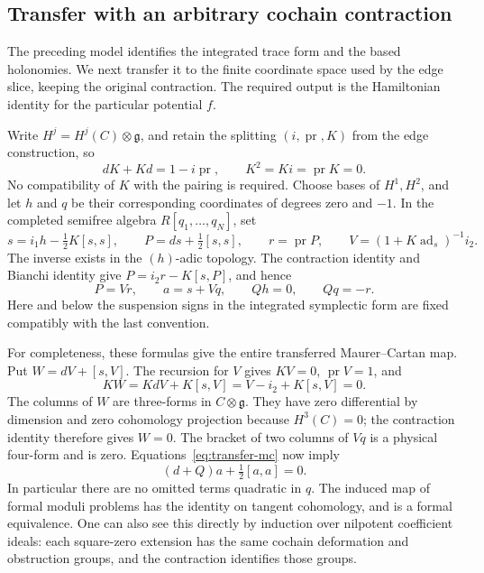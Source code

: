 \subsection{Transfer with an arbitrary cochain contraction}

The preceding model identifies the integrated trace form and the based
holonomies. We next transfer it to the finite coordinate space used by
the edge slice, keeping the original contraction. The required output
is the Hamiltonian identity for the particular potential $f$.

Write \(H^j=H^j(C)\otimes\mathfrak g\), and retain the splitting
\((i,\operatorname{pr},K)\) from the edge construction, so
\[
 dK+Kd=1-i\operatorname{pr},\qquad
 K^2=Ki=\operatorname{pr}K=0.
\]
No compatibility of \(K\) with the pairing is required.  Choose bases
of \(H^1,H^2\), and let \(h\) and \(q\) be their corresponding
coordinates of degrees zero and \(-1\).  In the completed semifree
algebra \(R[q_1,\ldots,q_N]\), set
\begin{equation}
\label{eq:transfer-v}
 s=i_1h-\tfrac12K[s,s],\qquad
 P=ds+\tfrac12[s,s],\qquad r=\operatorname{pr}P,
 \qquad V=(1+K\operatorname{ad}_s)^{-1}i_2.
\end{equation}
The inverse exists in the \((h)\)-adic topology.  The contraction
identity and Bianchi identity give
\(P=i_2r-K[s,P]\), and hence
\begin{equation}
\label{eq:transfer-mc}
                 P=Vr,\qquad a=s+Vq,\qquad Qh=0,
                 \qquad Qq=-r.
\end{equation}
Here and below the suspension signs in the integrated symplectic form
are fixed compatibly with the last convention.

For completeness, these formulas give the entire transferred
Maurer--Cartan map.  Put \(W=dV+[s,V]\).  The recursion for \(V\) gives
\(KV=0\), \(\operatorname{pr}V=1\), and
\[
 KW=KdV+K[s,V]=V-i_2+K[s,V]=0.
\]
The columns of \(W\) are three-forms in \(C\otimes\mathfrak g\).
They have zero differential by dimension and zero cohomology projection
because \(H^3(C)=0\); the contraction identity therefore gives \(W=0\).
The bracket of two columns of \(Vq\) is a physical four-form and is
zero.  Equations~\eqref{eq:transfer-mc} now imply
\[
                    (d+Q)a+\tfrac12[a,a]=0.
\]
In particular there are no omitted terms quadratic in \(q\).
The induced map of formal moduli problems has the identity on tangent
cohomology, and is a formal equivalence.  One can also see this directly
by induction over nilpotent coefficient ideals: each square-zero
extension has the same cochain deformation and obstruction groups, and
the contraction identifies those groups.

